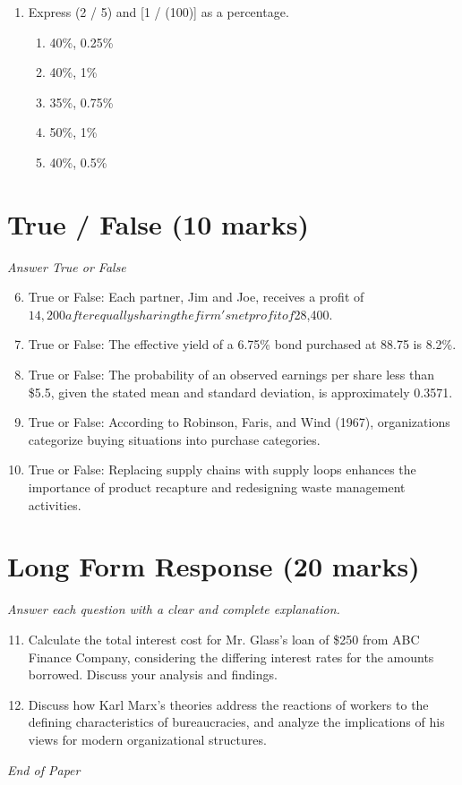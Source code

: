 \documentclass[12pt]{article}
\begin{document}
\begin{enumerate}[label=\arabic*.]
\begin{enumerate}[label=(\alph*)]
    \item \$6.00
    \item \$1.50
    \item \$5.00
    \item \$4.00
    \item \$0.20
\end{enumerate}
\item Express (2 / 5) and [1 / (100)] as a percentage.
\begin{enumerate}[label=(\alph*)]
    \item 40\%, 0.25\%
    \item 40\%, 1\%
    \item 35\%, 0.75\%
    \item 50\%, 1\%
    \item 40\%, 0.5\%
\end{enumerate}
\end{enumerate}

\section*{True / False (10 marks)}
\textit{Answer True or False}
\begin{enumerate}[label=\arabic*.]
\setcounter{enumi}{5}
\item True or False: Each partner, Jim and Joe, receives a profit of $14,200 after equally sharing the firm's net profit of $28,400.
\item True or False: The effective yield of a 6.75\% bond purchased at 88.75 is 8.2\%.
\item True or False: The probability of an observed earnings per share less than \$5.5, given the stated mean and standard deviation, is approximately 0.3571.
\item True or False: According to Robinson, Faris, and Wind (1967), organizations categorize buying situations into purchase categories.
\item True or False: Replacing supply chains with supply loops enhances the importance of product recapture and redesigning waste management activities.
\end{enumerate}

\section*{Long Form Response (20 marks)}
\textit{Answer each question with a clear and complete explanation.}
\begin{enumerate}[label=\arabic*.]
\setcounter{enumi}{10}
\item Calculate the total interest cost for Mr. Glass's loan of \$250 from ABC Finance Company, considering the differing interest rates for the amounts borrowed. Discuss your analysis and findings.
\item Discuss how Karl Marx's theories address the reactions of workers to the defining characteristics of bureaucracies, and analyze the implications of his views for modern organizational structures.
\end{enumerate}

\vfill
\noindent\textit{End of Paper}
\end{document}
